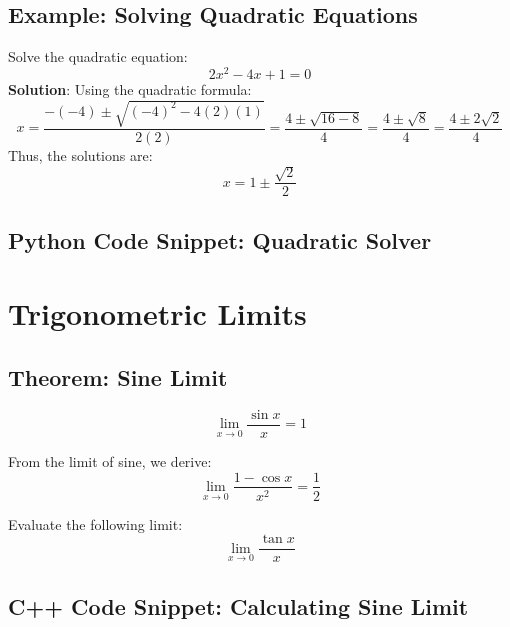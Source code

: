 \subsection{Example: Solving Quadratic Equations}
\begin{example}
Solve the quadratic equation:
\[
2x^2 - 4x + 1 = 0
\]
\textbf{Solution}: Using the quadratic formula:
\[
x = \frac{-(-4) \pm \sqrt{(-4)^2 - 4(2)(1)}}{2(2)} = \frac{4 \pm \sqrt{16 - 8}}{4} = \frac{4 \pm \sqrt{8}}{4} = \frac{4 \pm 2\sqrt{2}}{4}
\]
Thus, the solutions are:
\[
x = 1 \pm \frac{\sqrt{2}}{2}
\]
\end{example}

\subsection{Python Code Snippet: Quadratic Solver}
\begin{codesnippet}
\end{codesnippet}


\section{Trigonometric Limits}

\subsection{Theorem: Sine Limit}
\begin{theorem}
\[
\lim_{x \to 0} \frac{\sin x}{x} = 1
\]
\end{theorem}

\begin{cor}
From the limit of sine, we derive:
\[
\lim_{x \to 0} \frac{1 - \cos x}{x^2} = \frac{1}{2}
\]
\end{cor}

\begin{exercise}
Evaluate the following limit:
\[
\lim_{x \to 0} \frac{\tan x}{x}
\]
\end{exercise}

\subsection{C++ Code Snippet: Calculating Sine Limit}
\begin{codesnippet}
\end{codesnippet}

